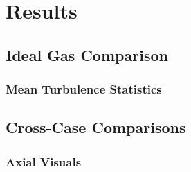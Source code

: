 \chapter{Results}


\section{Ideal Gas Comparison}
\subsection{Mean Turbulence Statistics}
\section{Cross-Case Comparisons}
\subsection{Axial Visuals}


